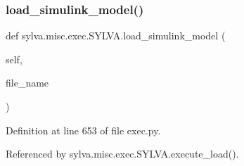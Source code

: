 \subsubsection{\texorpdfstring{load\+\_\+simulink\+\_\+model()}{load\_simulink\_model()}}
{\footnotesize\ttfamily def sylva.\+misc.\+exec.\+S\+Y\+L\+V\+A.\+load\+\_\+simulink\+\_\+model (\begin{DoxyParamCaption}\item[{}]{self,  }\item[{}]{file\+\_\+name }\end{DoxyParamCaption})}



Definition at line 653 of file exec.\+py.



Referenced by sylva.\+misc.\+exec.\+S\+Y\+L\+V\+A.\+execute\+\_\+load().



